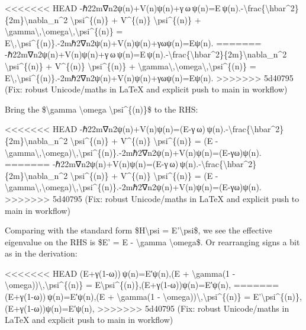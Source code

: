 \documentclass[]{article}
\begin{document}
<<<<<<< HEAD
-ℏ22m∇n2ψ(n)+V(n)ψ(n)+γ ω ψ(n)=E ψ(n).-\textbackslash frac\{\textbackslash hbar\^{}2\}\{2m\}\textbackslash nabla\_n\^{}2
\textbackslash psi\^{}\{(n)\} + V\^{}\{(n)\}
\textbackslash psi\^{}\{(n)\} +
\textbackslash gamma\textbackslash,\textbackslash omega\textbackslash,\textbackslash psi\^{}\{(n)\}
=
E\textbackslash,\textbackslash psi\^{}\{(n)\}.-2mℏ2\hspace{0pt}∇n2\hspace{0pt}ψ(n)+V(n)ψ(n)+γωψ(n)=Eψ(n).
=======
-ℏ22m∇n2ψ(n)+V(n)ψ(n)+γ ω ψ(n)=E ψ(n).-\textbackslash{}frac\{\textbackslash{}hbar\^{}2\}\{2m\}\textbackslash{}nabla\_n\^{}2
\textbackslash{}psi\^{}\{(n)\} + V\^{}\{(n)\}
\textbackslash{}psi\^{}\{(n)\} +
\textbackslash{}gamma\textbackslash{},\textbackslash{}omega\textbackslash{},\textbackslash{}psi\^{}\{(n)\}
=
E\textbackslash{},\textbackslash{}psi\^{}\{(n)\}.-2mℏ2​∇n2​ψ(n)+V(n)ψ(n)+γωψ(n)=Eψ(n).
>>>>>>> 5d40795 (Fix: robust Unicode/maths in LaTeX and explicit push to main in workflow)

Bring the \$\textbackslash{}gamma \textbackslash{}omega
\textbackslash{}psi\^{}\{(n)\}\$ to the RHS:

<<<<<<< HEAD
-ℏ22m∇n2ψ(n)+V(n)ψ(n)=(E-γ ω) ψ(n).-\textbackslash frac\{\textbackslash hbar\^{}2\}\{2m\}\textbackslash nabla\_n\^{}2
\textbackslash psi\^{}\{(n)\} + V\^{}\{(n)\}
\textbackslash psi\^{}\{(n)\} = (E -
\textbackslash gamma\textbackslash,\textbackslash omega)\textbackslash,\textbackslash psi\^{}\{(n)\}.-2mℏ2\hspace{0pt}∇n2\hspace{0pt}ψ(n)+V(n)ψ(n)=(E-γω)ψ(n).\hspace{0pt}
=======
-ℏ22m∇n2ψ(n)+V(n)ψ(n)=(E-γ ω) ψ(n).-\textbackslash{}frac\{\textbackslash{}hbar\^{}2\}\{2m\}\textbackslash{}nabla\_n\^{}2
\textbackslash{}psi\^{}\{(n)\} + V\^{}\{(n)\}
\textbackslash{}psi\^{}\{(n)\} = (E -
\textbackslash{}gamma\textbackslash{},\textbackslash{}omega)\textbackslash{},\textbackslash{}psi\^{}\{(n)\}.-2mℏ2​∇n2​ψ(n)+V(n)ψ(n)=(E-γω)ψ(n).​
>>>>>>> 5d40795 (Fix: robust Unicode/maths in LaTeX and explicit push to main in workflow)

Comparing with the standard form \$H\textbackslash{}psi =
E'\textbackslash{}psi\$, we see the effective eigenvalue on the RHS is
\$E' = E - \textbackslash{}gamma \textbackslash{}omega\$. Or rearranging
signs a bit as in the derivation:

<<<<<<< HEAD
(E+γ(1-ω)) ψ(n)=E′ψ(n),(E + \textbackslash gamma(1 -
\textbackslash omega))\textbackslash,\textbackslash psi\^{}\{(n)\} =
E\textquotesingle\textbackslash psi\^{}\{(n)\},(E+γ(1-ω))ψ(n)=E′ψ(n),
=======
(E+γ(1-ω)) ψ(n)=E′ψ(n),(E + \textbackslash{}gamma(1 -
\textbackslash{}omega))\textbackslash{},\textbackslash{}psi\^{}\{(n)\} =
E'\textbackslash{}psi\^{}\{(n)\},(E+γ(1-ω))ψ(n)=E′ψ(n),
>>>>>>> 5d40795 (Fix: robust Unicode/maths in LaTeX and explicit push to main in workflow)
\end{document}
